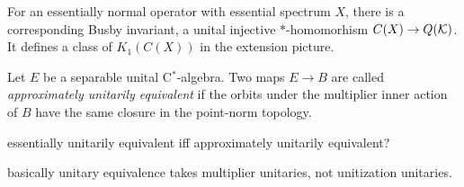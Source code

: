 \documentclass{../../large}
\begin{document}
\begin{prb}
For an essentially normal operator with essential spectrum $X$, there is a corresponding Busby invariant, a unital injective $*$-homomorhism $C(X)\to Q(\mathcal{K})$.
It defines a class of $K_1(C(X))$ in the extension picture.





Let $E$ be a separable unital C$^*$-algebra.
Two maps $E\to B$ are called \emph{approximately unitarily equivalent} if the orbits under the multiplier inner action of $B$ have the same closure in the point-norm topology.

essentially unitarily equivalent iff approximately unitarily equivalent?

basically unitary equivalence takes multiplier unitaries, not unitization unitaries.

\end{prb}
\end{document}
